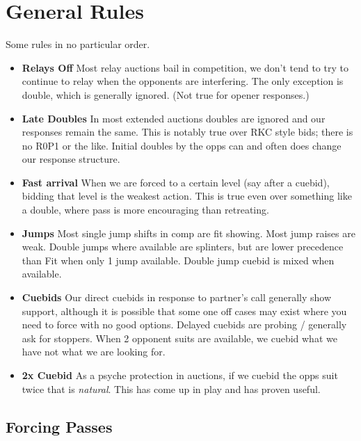 \documentclass[tom-ari]{subfile}
\begin{document}
	
\chapter{General Rules}


Some rules in no particular order.

\begin{itemize}[]
\item \textbf{Relays Off} Most relay auctions bail in competition, we don't tend to try to continue to relay when the opponents are interfering. The only exception is double, which is generally ignored. (Not true for  opener responses.)
\item \textbf{Late Doubles} In most extended auctions doubles are ignored and our responses remain the same. This is notably true over RKC style bids; there is no R0P1 or the like. Initial doubles by the opps can and often does change our response structure.
\item \textbf{Fast arrival} When we are forced to a certain level (say after a cuebid), bidding that level is the weakest action. This is true even over something like a double, where pass is more encouraging than retreating.
\item \textbf{Jumps} Most single jump shifts in comp are fit showing. Most jump raises are weak. Double jumps where available are splinters, but are lower precedence than Fit when only 1 jump available. Double jump cuebid is mixed when available.
\item \textbf{Cuebids} Our direct cuebids in response to partner's call generally show support, although it is possible that some one off cases may exist where you need to force with no good options.  Delayed cuebids are probing / generally ask for stoppers. When 2 opponent suits are available, we cuebid what we have not what we are looking for.
\item \textbf{2x Cuebid} As a psyche protection in  auctions, if we cuebid the opps suit twice that is \textit{natural}. This has come up in play and has proven useful.
\end{itemize}

\section{Forcing Passes}
\end{document}
